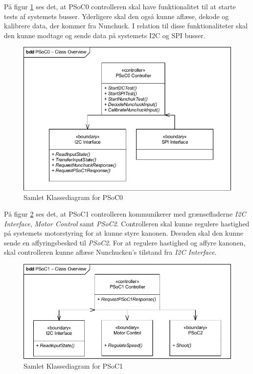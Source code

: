 \noindent På figur \ref{fig:CompleteClassDiagramPSoC0} ses det, at PSoC0 controlleren skal have funktionalitet til at starte tests af systemets busser. Yderligere skal den også kunne aflæse, dekode og kalibrere data, der kommer fra Nunchuck. I relation til disse funktionaliteter skal den kunne modtage og sende data på systemets I2C og SPI busser.
\begin{figure}[H]
	\centering
	\includegraphics[width=\textwidth] {Systemarkitektur/images/CompleteClassDiagramPSoC0}
	\caption{Samlet Klassediagram for PSoC0}
	\label{fig:CompleteClassDiagramPSoC0}
\end{figure}

\noindent På figur \ref{fig:CompleteClassDiagramPSoC1} ses det, at PSoC1 controlleren kommunikerer med grænsefladerne \textit{I2C Interface}, \textit{Motor Control} samt \textit{PSoC2}. Controlleren skal kunne regulere hastighed på systemets motorstyring for at kunne styre kanonen. Desuden skal den kunne sende en affyringsbesked til \textit{PSoC2}. For at regulere hastighed og affyre kanonen, skal controlleren kunne aflæse Nunchucken's tilstand fra \textit{I2C Interface}.

\begin{figure}[H]
	\centering
	\includegraphics[width=\textwidth] {Systemarkitektur/images/CompleteClassDiagramPSoC1}
	\caption{Samlet Klassediagram for PSoC1}
	\label{fig:CompleteClassDiagramPSoC1}
\end{figure}

